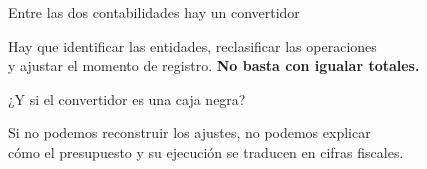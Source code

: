 \begin{frame}{Entre las dos contabilidades hay un convertidor}
\centering
{}
\par\small
Hay que identificar las entidades, reclasificar las operaciones\\
y ajustar el momento de registro. \textbf{No basta con igualar totales.}
\fuenteCaja
{}
\end{frame}

\begin{frame}{¿Y si el convertidor es una caja negra?}
\centering
{}
\par\small
Si no podemos reconstruir los ajustes, no podemos explicar\\
cómo el presupuesto y su ejecución se traducen en cifras fiscales.
\fuenteCaja
{}
\end{frame}
